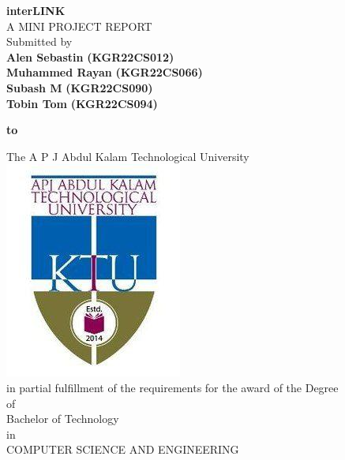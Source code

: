 \documentclass[twoside,a4paper,openright]{report} %
\begin{document}
	
	
	
	
	\begin{center}
		
		{\Large \textbf{interLINK}}\\
		
		A MINI PROJECT REPORT\\
		\vspace{1cm}  %
		Submitted by \\
		\vspace{0.6cm}   %
		\textbf{Alen Sebastin} \textbf{(KGR22CS012)}\\
		\vspace{0.3cm}   %
		\textbf{Muhammed Rayan } \textbf{(KGR22CS066)}\\
		\vspace{0.3cm}   %
		\textbf{Subash M } \textbf{(KGR22CS090)}\\
		\vspace{0.3cm}   %
		\textbf{Tobin Tom } \textbf{(KGR22CS094)}\\
		\vspace{0.6cm}   %
		
		\textbf{to}\\
		\vspace{0.8cm}   %
		
		The A P J Abdul Kalam Technological University \\
		\vspace{0.6cm}\hspace{0.3cm}\includegraphics[scale=0.3]{ktu.jpg} \\
		in partial fulfillment of the requirements for the award of the Degree \\
		\vspace{0.6cm}   %
		of\\
		\vspace{0.6cm}   %
		Bachelor of Technology \\
		\vspace{0.6cm}   %
		in\\
		\vspace{0.6cm}   %
		COMPUTER SCIENCE AND ENGINEERING
	\end{center}
	
\end{document}
